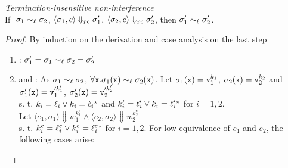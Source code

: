 \begin{myThm}{\emph{Termination-insensitive non-interference}}\\
\label{thm:app:gpua:ni}
If
$~\sigma_1 \sim_\ell \sigma_2$, 
$\langle \sigma_1, c  \rangle \Downarrow_{\mathit{pc}} \sigma_1' $, 
$\langle \sigma_2, c   \rangle\Downarrow_{\mathit{pc}} \sigma_2' $, 
then 
$\sigma_1' \sim_\ell \sigma_2'$.
\end{myThm}
\begin{proof}
By induction on the derivation and case analysis on the last step
\begin{enumerate}
 \item {}: $\sigma_1' = \sigma_1 \sim_\ell \sigma_2 = \sigma_2'$

 \item {} and : As $\sigma_1 \sim_\ell \sigma_2$, 
   $\forall \texttt{x}. \sigma_1(\texttt{x}) \sim_\ell \sigma_2(\texttt{x})$. Let $\sigma_1(\texttt{x}) =
   \texttt{v}_1^{k_1}$, $\sigma_2(\texttt{x}) = \texttt{v}_2^{k_2}$ and \\ $\sigma_1'(\texttt{x}) =
   \texttt{v}_1'^{k_1'}$, $\sigma_2'(\texttt{x}) = \texttt{v}_2'^{k_2'}$ \\ s. t. $k_i = \ell_i
   \vee k_i =   \ell_i {}^\star  $ and $k'_i = \ell'_i
   \vee k_i =   \ell'_i {}^\star  $ for $i=1,2$. \\
   Let
   $\langle  e_1, \sigma_1 \rangle \Downarrow
   w_1^{k^{e}_1} \wedge \langle  e_2, \sigma_2 \rangle \Downarrow
   w_2^{k^{e}_2}$ \\ s. t. $k^{e}_i =
   \ell^{e}_i \vee k^{e}_i =   \ell^{e}_i {}^\star  $ for $i
   =1,2$.
      For low-equivalence of $e_1$ and $e_2$, the following cases
       arise:
       \begin{enumerate}
         

\end{enumerate}
\end{enumerate}
\end{proof}
